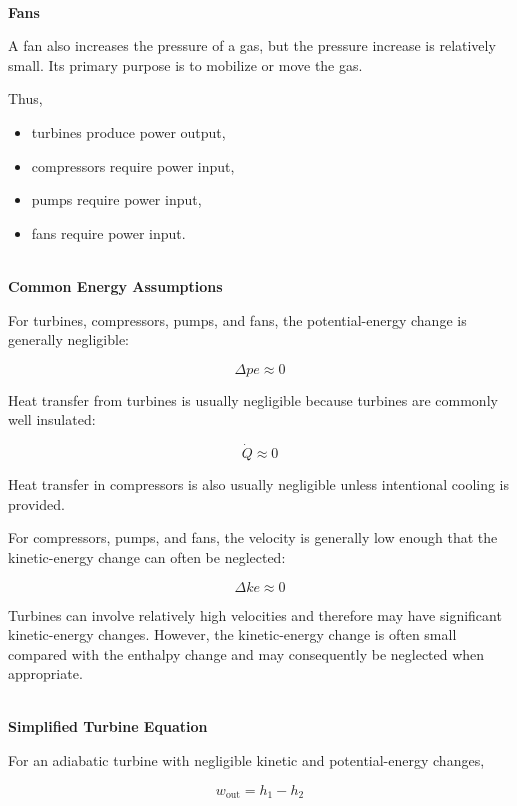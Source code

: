 \documentclass[12pt]{article}
\begin{document}
\textbf{\\ Fans}

A fan also increases the pressure of a gas, but the pressure increase is relatively small. Its primary purpose is to mobilize or move the gas.

Thus,

\begin{itemize}
    \item turbines produce power output,
    \item compressors require power input,
    \item pumps require power input,
    \item fans require power input.
\end{itemize}

\textbf{\\ Common Energy Assumptions}

For turbines, compressors, pumps, and fans, the potential-energy change is generally negligible:

\begin{equation*}
\Delta pe\approx0
\end{equation*}

Heat transfer from turbines is usually negligible because turbines are commonly well insulated:

\begin{equation*}
\dot{Q}\approx0
\end{equation*}

Heat transfer in compressors is also usually negligible unless intentional cooling is provided.

For compressors, pumps, and fans, the velocity is generally low enough that the kinetic-energy change can often be neglected:

\begin{equation*}
\Delta ke\approx0
\end{equation*}

Turbines can involve relatively high velocities and therefore may have significant kinetic-energy changes. However, the kinetic-energy change is often small compared with the enthalpy change and may consequently be neglected when appropriate.

\textbf{\\ Simplified Turbine Equation}

For an adiabatic turbine with negligible kinetic and potential-energy changes,

\begin{equation*}
w_{\mathrm{out}}
=
h_1-h_2
\end{equation*}
\end{document}
